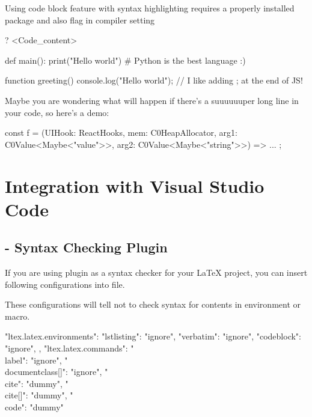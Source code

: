 \documentclass{article}
\begin{document}
    \begin{note}
        Using code block feature with syntax highlighting requires a properly installed  package and also  flag in compiler setting
    \end{note}

\begin{codeblock}[tex]
\begin {codeblock} [<Language>]?
<Code_content>
\end {codeblock}
\end{codeblock}

\begin{codeblock}[python]
def main():
    print("Hello world")        # Python is the best language :)
\end{codeblock}

\begin{codeblock}[javascript]
function greeting() {
    console.log("Hello world"); // I like adding ; at the end of JS!
}
\end{codeblock}

Maybe you are wondering what will happen if there's a suuuuuuper long line in your code, so here's a demo:

\begin{codeblock}[typescript]
const f = (UIHook: ReactHooks, mem: C0HeapAllocator, arg1: C0Value<Maybe<"value">>, arg2: C0Value<Maybe<"string">>) => { ... };
\end{codeblock}

\section{Integration with Visual Studio Code}
\subsection{ - Syntax Checking Plugin}

If you are using  plugin as a syntax checker for your LaTeX project, you can insert following configurations into  file.

These configurations will tell  not to check syntax for contents in  environment or  macro.

\begin{codeblock}[json]
"ltex.latex.environments": {
    "lstlisting": "ignore",
    "verbatim": "ignore",
    "codeblock": "ignore",
},
"ltex.latex.commands": {
    "\\label{}": "ignore",
    "\\documentclass[]{}": "ignore",
    "\\cite{}": "dummy",
    "\\cite[]{}": "dummy",
    "\\code{}": "dummy"
}
\end{codeblock}
\end{document}

